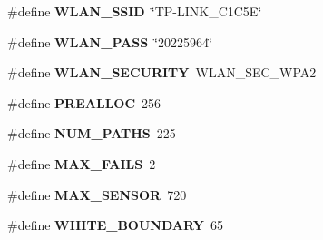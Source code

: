 \begin{DoxyCompactItemize}
\item 
\hypertarget{compressed_sensing_8ino_af8d23ae6c17168a7ce76f565959a7100}{\#define {\bfseries W\+L\+A\+N\+\_\+\+S\+S\+I\+D}~\char`\"{}T\+P-\/L\+I\+N\+K\+\_\+C1\+C5\+E\char`\"{}}\label{compressed_sensing_8ino_af8d23ae6c17168a7ce76f565959a7100}

\item 
\hypertarget{compressed_sensing_8ino_a81677f718a77a70296f7681cdb913455}{\#define {\bfseries W\+L\+A\+N\+\_\+\+P\+A\+S\+S}~\char`\"{}20225964\char`\"{}}\label{compressed_sensing_8ino_a81677f718a77a70296f7681cdb913455}

\item 
\hypertarget{compressed_sensing_8ino_afac8a1382cf2af5f3045eab50669e6d0}{\#define {\bfseries W\+L\+A\+N\+\_\+\+S\+E\+C\+U\+R\+I\+T\+Y}~W\+L\+A\+N\+\_\+\+S\+E\+C\+\_\+\+W\+P\+A2}\label{compressed_sensing_8ino_afac8a1382cf2af5f3045eab50669e6d0}

\item 
\hypertarget{compressed_sensing_8ino_a9dadacd5ee41d21ea8974d66757983dd}{\#define {\bfseries P\+R\+E\+A\+L\+L\+O\+C}~256}\label{compressed_sensing_8ino_a9dadacd5ee41d21ea8974d66757983dd}

\item 
\hypertarget{compressed_sensing_8ino_af217a5dc61c4e5069971d91a9d9048f7}{\#define {\bfseries N\+U\+M\+\_\+\+P\+A\+T\+H\+S}~225}\label{compressed_sensing_8ino_af217a5dc61c4e5069971d91a9d9048f7}

\item 
\hypertarget{compressed_sensing_8ino_ad35df4142741edb3e8a06a384611e41f}{\#define {\bfseries M\+A\+X\+\_\+\+F\+A\+I\+L\+S}~2}\label{compressed_sensing_8ino_ad35df4142741edb3e8a06a384611e41f}

\item 
\hypertarget{compressed_sensing_8ino_ab31fd7569f9643816a5f7715e65cd172}{\#define {\bfseries M\+A\+X\+\_\+\+S\+E\+N\+S\+O\+R}~720}\label{compressed_sensing_8ino_ab31fd7569f9643816a5f7715e65cd172}

\item 
\hypertarget{compressed_sensing_8ino_a7ad8821d9f5a7551178b769258fa4866}{\#define {\bfseries W\+H\+I\+T\+E\+\_\+\+B\+O\+U\+N\+D\+A\+R\+Y}~65}\label{compressed_sensing_8ino_a7ad8821d9f5a7551178b769258fa4866}

\end{DoxyCompactItemize}
